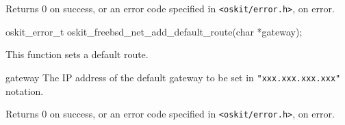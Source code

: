 \begin{apiret}
        Returns 0 on success, or an error code specified in
        {\tt <oskit/error.h>}, on error.
\end{apiret}


%
%

\begin{apisyn}

        \funcproto oskit_error_t
		oskit_freebsd_net_add_default_route(char *gateway);
\end{apisyn}
\ostonet

\begin{apidesc}
	This function sets a default route.

\end{apidesc}

\begin{apiparm}
	\item[gateway]
	The IP address of the default gateway to be set in 
	\texttt{"xxx.xxx.xxx.xxx"} notation.
\end{apiparm}

\begin{apiret}
        Returns 0 on success, or an error code specified in
        {\tt <oskit/error.h>}, on error.
\end{apiret}

